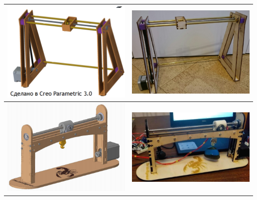 \begin{tabular}{|p{7cm}|p{7cm}|}
    \includegraphics[width=7cm]{6} & \includegraphics[width=7cm]{7} \\
    \hline
    \includegraphics[width=7cm]{8} & \includegraphics[width=7cm]{9} \\
    \hline
\end{tabular}
